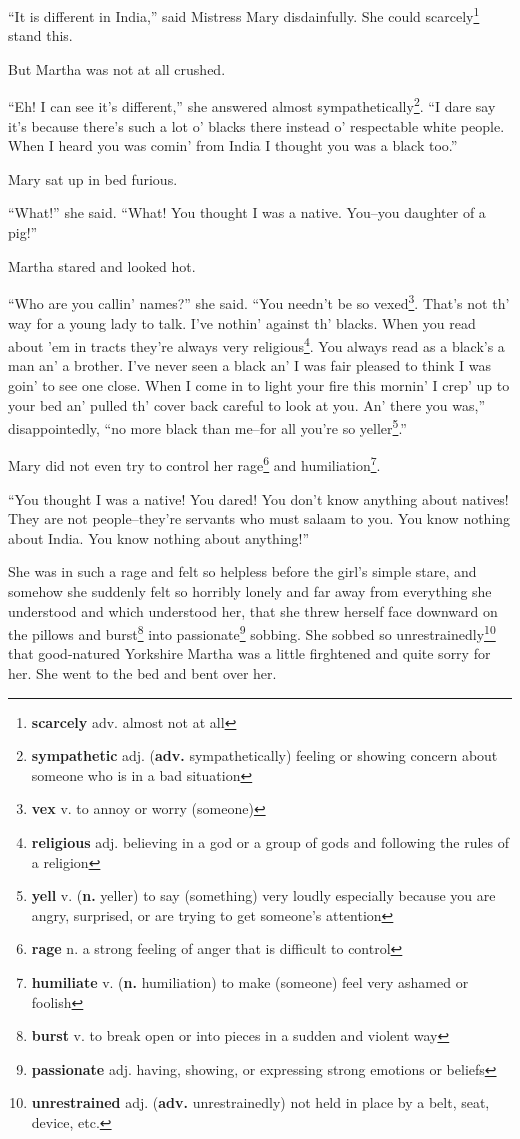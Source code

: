 ``It is different in India,'' said Mistress Mary disdainfully. She could scarcely\footnote{\textbf{scarcely} adv. almost not at all} stand this.

But Martha was not at all crushed.

``Eh! I can see it's different,'' she answered almost sympathetically\footnote{\textbf{sympathetic} adj. (\textbf{adv.} sympathetically) feeling or showing concern about someone who is in a bad situation}. ``I dare say it's because there's such a lot o' blacks there instead o' respectable white people. When I heard you was comin' from India I thought you was a black too.''

Mary sat up in bed furious.

``What!'' she said. ``What! You thought I was a native. You--you daughter of a pig!''

Martha stared and looked hot.

``Who are you callin' names?'' she said. ``You needn't be so vexed\footnote{\textbf{vex} v. to annoy or worry (someone)}. That's not th' way for a young lady to talk. I've nothin' against th' blacks. When you read about 'em in tracts they're always very religious\footnote{\textbf{religious} adj. believing in a god or a group of gods and following the rules of a religion}. You always read as a black's a man an' a brother. I've never seen a black an' I was fair pleased to think I was goin' to see one close. When I come in to light your fire this mornin' I crep' up to your bed an' pulled th' cover back careful to look at you. An' there you was,'' disappointedly, ``no more black than me--for all you're so yeller\footnote{\textbf{yell} v. (\textbf{n.} yeller) to say (something) very loudly especially because you are angry, surprised, or are trying to get someone's attention}.''

Mary did not even try to control her rage\footnote{\textbf{rage} n. a strong feeling of anger that is difficult to control} and humiliation\footnote{\textbf{humiliate} v. (\textbf{n.} humiliation) to make (someone) feel very ashamed or foolish}.

``You thought I was a native! You dared! You don't know anything about natives! They are not people--they're servants who must salaam to you. You know nothing about India. You know nothing about anything!''

She was in such a rage and felt so helpless before the girl's simple stare, and somehow she suddenly felt so horribly lonely and far away from everything she understood and which understood her, that she threw herself face downward on the pillows and burst\footnote{\textbf{burst} v. to break open or into pieces in a sudden and violent way} into passionate\footnote{\textbf{passionate} adj. having, showing, or expressing strong emotions or beliefs} sobbing. She sobbed so unrestrainedly\footnote{\textbf{unrestrained} adj. (\textbf{adv.} unrestrainedly) not held in place by a belt, seat, device, etc.} that good-natured Yorkshire Martha was a little firghtened and quite sorry for her. She went to the bed and bent over her.

